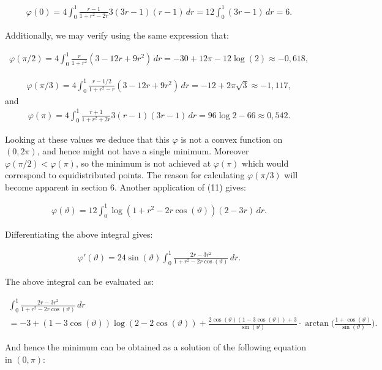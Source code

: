 \documentclass{amsart}[11pt]
\newcommand{\vphi}{\varphi}
\newcommand{\vth}{\vartheta}
\theoremstyle{definition}
\begin{document}
\begin{gather*}
\vphi(0) = 4 \int_0^1 \frac{r-1}{1 + r^2 - 2r} 3(3r-1)(r-1) \,dr = 12 \int_0^1 (3r-1) \,dr  = 6.
\end{gather*}

Additionally, we may verify using the same expression that:

\begin{gather*}
\vphi(\pi/2) = 4 \int_0^1 \frac{r}{1+r^2}(3 - 12r + 9r^2) \,dr  = -30 + 12 \pi - 12\log(2) \approx -0,618,
\end{gather*}

\begin{gather*}
\vphi(\pi/3) = 4 \int_0^1 \frac{r- 1/2}{1+r^2-r}(3 - 12r + 9r^2) \,dr  = -12 + 2\pi\sqrt{3} \approx -1,117,
\end{gather*}
and 
\begin{gather*}
\vphi(\pi) = 4 \int_0^1 \frac{r+1}{1 + r^2 + 2r} 3(r-1)(3r-1) \,dr = 96\log2 - 66 \approx 0,542.
\end{gather*}

Looking at these values we deduce that this $\vphi$ is not a convex function on $(0,2\pi)$, and hence might not have a single minimum. Moreover $\vphi(\pi/2) < \vphi(\pi)$, so the minimum is not achieved at $\vphi(\pi)$ which would correspond to equidistributed points. The reason for calculating $\vphi(\pi/3)$ will become apparent in section 6. Another application of (11) gives:

\begin{gather*}
    \vphi(\vth) = 12 \int_0^1 \log(1 + r^2 - 2r \cos(\vth)) (2 - 3r)\,dr .
\end{gather*}

Differentiating the above integral gives:

 \begin{gather*}
     \vphi'(\vth) = 24 \sin(\vth) \int_0^1 \frac{2r-3r^2}{1+r^2-2r\cos(\vth)}\,dr.
 \end{gather*}

The above integral can be evaluated as:

\begin{gather*}
\int_0^1 \frac{2r-3r^2}{1+r^2-2r\cos(\vth)}\,dr \\
= -3 + (1 -3 \cos(\vth))\log(2-2\cos(\vth)) + \frac{2\cos(\vth)(1-3\cos(\vth))+3}{\sin(\vth)}\cdot \arctan\bigg(\frac{1 + \cos(\vth)}{\sin(\vth)}\bigg) .
\end{gather*}

And hence the minimum can be obtained as a solution of the following equation in $(0, \pi)$:
\end{document}

